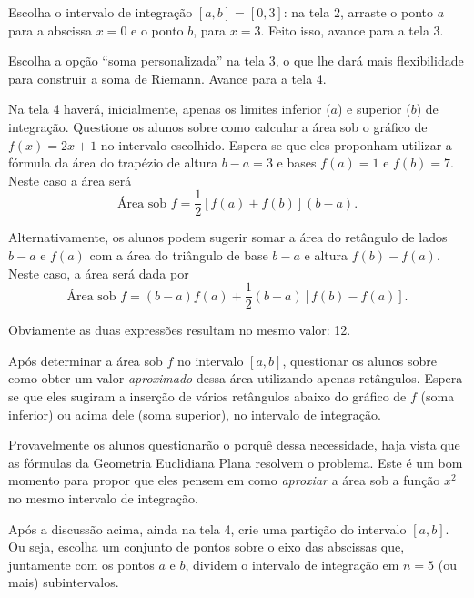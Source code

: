 \documentclass[a4paper,12pt]{scrartcl}
\begin{document}
\begin{list}{.}
      \item Escolha o intervalo de integração $[a,b]=[0,3]$: na tela 2, arraste o ponto $a$ para a abscissa $x = 0$ e o ponto $b$, para $x = 3$. Feito isso, avance para a tela 3.
      
      \item Escolha a opção ``soma personalizada'' na tela 3, o que lhe dará mais flexibilidade para construir a soma de Riemann. Avance para a tela 4.
      
      \item \label{step:area} Na tela 4 haverá, inicialmente, apenas os limites inferior ($a$) e superior ($b$) de integração. Questione os alunos sobre como calcular a área sob o gráfico de $f(x) = 2x + 1$ no intervalo escolhido. Espera-se que eles proponham utilizar a fórmula da área do trapézio de altura $b - a = 3$ e bases $f(a) = 1$ e $f(b) = 7$. Neste caso a área será
      \begin{equation*}
	\text{Área sob $f$} = \frac{1}{2}\left[f(a) + f(b)\right](b - a).
      \end{equation*}
      
      Alternativamente, os alunos podem sugerir somar a área do retângulo de lados $b - a$ e $f(a)$ com a área do triângulo de base $b - a$ e altura $f(b) - f(a)$. Neste caso, a área será dada por
      \begin{equation*}
       \text{Área sob $f$} = (b - a)f(a) + \frac{1}{2}(b - a)\left[f(b) - f(a)\right].
      \end{equation*}
      
      Obviamente as duas expressões resultam no mesmo valor: 12.

      \item Após determinar a área sob $f$ no intervalo $[a,b]$, questionar os alunos sobre como obter um valor \emph{aproximado} dessa área utilizando apenas retângulos. Espera-se que eles sugiram a inserção de vários retângulos abaixo do gráfico de $f$ (soma inferior) ou acima dele (soma superior), no intervalo de integração.
      
      Provavelmente os alunos questionarão o porquê dessa necessidade, haja vista que as fórmulas da Geometria Euclidiana Plana resolvem o problema.
      Este é um bom momento para propor que eles pensem em como \emph{aproxiar} a área sob a função $x^2$ no mesmo intervalo de integração.
    
      \item Após a discussão acima, ainda na tela 4, crie uma partição do intervalo $[a,b]$. Ou seja, escolha um conjunto de pontos sobre o eixo das abscissas que, juntamente com os pontos $a$ e $b$, dividem o intervalo de integração em $n = 5$ (ou mais) subintervalos. 
      

\end{list}
\end{document}
